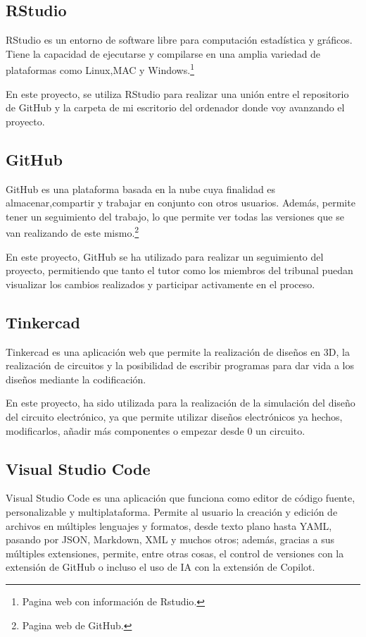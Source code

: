 \subsection{RStudio}
RStudio es un entorno de software libre para computación estadística y gráficos. Tiene la capacidad de ejecutarse y compilarse en una amplia variedad de plataformas como Linux,MAC y Windows.\cite{Rstudio}\footnote{Pagina web con información de Rstudio\cite{Rstudio}.}

En este proyecto, se utiliza RStudio para realizar una unión entre el repositorio de GitHub y la carpeta de mi escritorio del ordenador donde voy avanzando el proyecto.
\subsection{GitHub}
GitHub es una plataforma basada en la nube cuya finalidad es almacenar,compartir y trabajar en conjunto con otros usuarios. 
Además, permite tener un seguimiento del trabajo, lo que permite ver todas las versiones que se van realizando de este mismo.\cite{GitHub}\footnote{Pagina web de GitHub\cite{GitHub}.} 

En este proyecto, GitHub se ha utilizado para realizar un seguimiento del proyecto, permitiendo que tanto el tutor como los miembros del tribunal puedan visualizar los cambios realizados y participar activamente en el proceso.
\subsection{Tinkercad}
Tinkercad es una aplicación web que permite la realización de diseños en 3D, la realización de circuitos y la posibilidad de escribir programas para dar vida a los diseños mediante la codificación.

En este proyecto, ha sido utilizada para la realización de la simulación del diseño del circuito electrónico, ya que permite utilizar diseños electrónicos ya hechos, modificarlos, añadir más componentes o empezar desde 0 un circuito.
\subsection{Visual Studio Code}
Visual Studio Code es una aplicación que funciona como editor de código fuente, personalizable y multiplataforma.
Permite al usuario la creación y edición de archivos en múltiples lenguajes y formatos, desde texto plano hasta YAML, pasando por JSON, Markdown, XML y muchos otros; además, gracias a sus múltiples extensiones, permite, entre otras cosas, el control de versiones con la extensión de GitHub o incluso el uso de IA con la extensión de Copilot.

